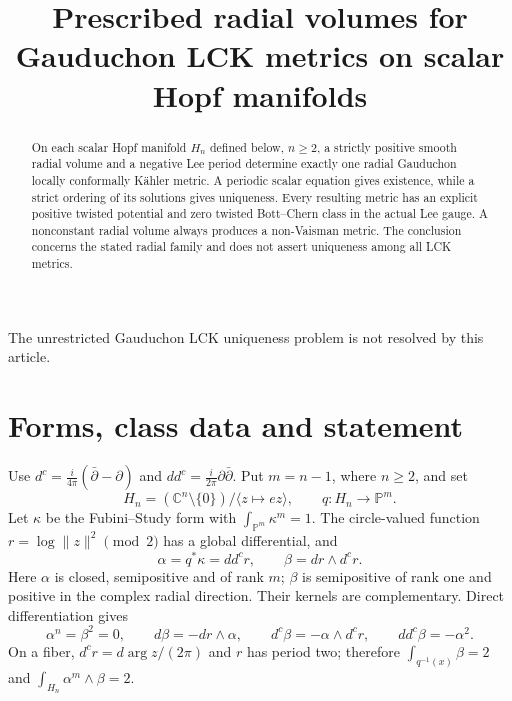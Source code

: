 \documentclass[11pt]{article}
\title{Prescribed radial volumes for Gauduchon LCK metrics\newline
on scalar Hopf manifolds}
\author{}
\date{}
\newcommand{\ddc}{dd^c}
\newcommand{\PP}{\mathbb P}
\theoremstyle{remark}\newtheorem{remark}[theorem]{Remark}
\begin{document}
\maketitle
\noindent The unrestricted Gauduchon LCK uniqueness problem is not
resolved by this article.
\begin{abstract}
On each scalar Hopf manifold $H_n$ defined below, $n\geq2$,
a strictly positive smooth radial volume and a negative Lee period
determine exactly one radial Gauduchon locally conformally K\"ahler
metric. A periodic scalar equation gives existence, while a strict
ordering of its solutions gives uniqueness. Every resulting metric has
an explicit positive twisted potential and zero twisted Bott--Chern
class in the actual Lee gauge. A nonconstant radial volume always
produces a non-Vaisman metric. The conclusion concerns the stated
radial family and does not assert uniqueness among all LCK metrics.
\end{abstract}

\section{Forms, class data and statement}
Use $d^c=\frac{i}{4\pi}(\bar\partial-\partial)$ and
$\ddc=\frac{i}{2\pi}\partial\bar\partial$. Put $m=n-1$, where
$n\ge2$, and set
\[
 H_n=(\mathbb C^n\setminus\{0\})/\langle z\mapsto ez\rangle,
 \qquad q:H_n\longrightarrow\PP^m.
\]
Let $\kappa$ be the Fubini--Study form with $\int_{\PP^m}\kappa^m=1$.
The circle-valued function $r=\log\|z\|^2\pmod2$ has a global
differential, and
\[
 \alpha=q^*\kappa=\ddc r,
 \qquad \beta=dr\wedge d^cr.
\]
Here $\alpha$ is closed, semipositive and of rank $m$; $\beta$ is
semipositive of rank one and positive in the complex radial direction.
Their kernels are complementary. Direct differentiation gives
\begin{equation}\label{eq:forms}
 \alpha^n=\beta^2=0,\qquad
 d\beta=-dr\wedge\alpha,\qquad
 d^c\beta=-\alpha\wedge d^cr,\qquad
 \ddc\beta=-\alpha^2.
\end{equation}
On a fiber, $d^cr=d\arg z/(2\pi)$ and $r$ has period two;
therefore $\int_{q^{-1}(x)}\beta=2$ and
$\int_{H_n}\alpha^m\wedge\beta=2$.
\end{document}
